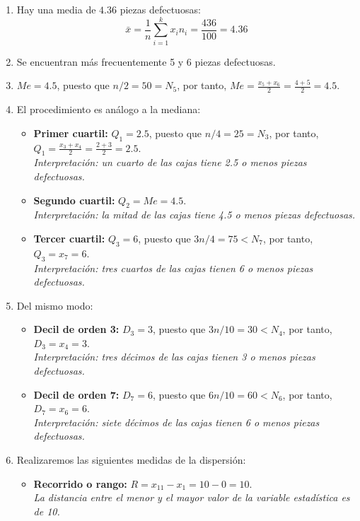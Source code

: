 \documentclass[11pt,a4paper]{article}
\theoremstyle{definition}
\begin{document}
\begin{enumerate}[label=\emph{\alph*})]
	\item Hay una media de $4.36$ piezas defectuosas:
		$$ \bar{x} = \frac{1}{n} \sum_{i=1}^{k}x_{i}n_{i}= \frac{436}{100} = 4.36$$
	\item Se encuentran más frecuentemente 5 y 6 piezas defectuosas.
	\item $Me=4.5$, puesto que $n/2=50=N_5$, por tanto, $Me = \frac{x_5+x_6}{2} = \frac{4+5}{2}=4.5$.
\pagebreak
	\item El procedimiento es análogo a la mediana:
	\begin{itemize}
		\item \textbf{Primer cuartil:} $Q_1 = 2.5$, puesto que $n/4 = 25 = N_3$, por tanto, $Q_1 = \frac{x_3+x_4}{2} = \frac{2+3}{2} = 2.5$. \\
		\emph{Interpretación: un cuarto de las cajas tiene 2.5 o menos piezas defectuosas.}
		\item \textbf{Segundo cuartil:} $Q_2 = Me = 4.5$. \\
		\emph{Interpretación: la mitad de las cajas tiene 4.5 o menos piezas defectuosas.}
		\item \textbf{Tercer cuartil:} $Q_3 = 6$, puesto que $3n/4 = 75 < N_7$, por tanto, $Q_3 = x_7 = 6$. \\
		\emph{Interpretación: tres cuartos de las cajas tienen 6 o menos piezas defectuosas.}
	\end{itemize}
	\item Del mismo modo:
	\begin{itemize}
		\item \textbf{Decil de orden 3:} $D_3 = 3$, puesto que $3n/10 = 30 < N_4$, por tanto, $D_3 = x_4 = 3$. \\
		\emph{Interpretación: tres décimos de las cajas tienen 3 o menos piezas defectuosas.}
		\item \textbf{Decil de orden 7:} $D_7 = 6$, puesto que $6n/10 = 60 < N_6$, por tanto, $D_7 = x_6 = 6$. \\
		\emph{Interpretación: siete décimos de las cajas tienen 6 o menos piezas defectuosas.}
	\end{itemize}
	\item Realizaremos las siguientes medidas de la dispersión:
	\begin{itemize}
		\item \textbf{Recorrido o rango:} $R = x_{11} - x_1 = 10 - 0 = 10$. \\
		\emph{La distancia entre el menor y el mayor valor de la variable estadística es de 10.}

\end{itemize}
\end{enumerate}
\end{document}

